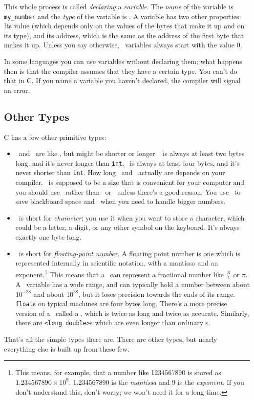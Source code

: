     This whole process is called {\em declaring}\/ a {\em variable}\/.
The {\em name}\/ of the variable is {\tt my\_number} and the {\em type}\/
of the variable is \int.  A variable has two other properties:  Its
value (which depends only on the values of the bytes that make it up and
on its type), and its address, which is the same as the address of the
first byte that makes it up.  Unless you say otherwise, \int\
variables always start with the value 0.

    In some languages you can use variables without declaring them; what
happens then is that the compiler assumes that they have a certain type.
You can't do that in C.  If you name a variable you haven't declared,
the compiler will signal an error.

\subsection{Other Types}

    C has a few other primitive types:

\begin{itemize}

\item \shortint\  and \longint\  are like \int, but might
be shorter or longer.  \shortint\ is always at least two bytes long, and
it's never longer than {\tt int}.  \longint\ is always at least four
bytes, and it's never shorter than {\tt int}.  How long \shortint\ and
\longint\ actually
are depends on your compiler.  \int\ is supposed to be a size that is
convenient for your computer and you should use \int\ rather than
\longint\ or \shortint\ unless there's a good
reason.  You use \shortint\ to save blackboard space and
\longint\ when you need to handle bigger numbers.

\item \chr\ is short for {\em character}\/; you use it when you
want to store a character, which could be a letter, a digit, or any
other symbol on the keyboard.  It's always exactly one byte long.

\item \float\ is short for {\em floating-point number}\/.  A
floating point number is one which is represented internally in
scientific notation, with a mantissa and an exponent.\footnote{This
means, for example, that a number like 1234567890 is stored as
$1.234567890\times 10^9$.  1.234567890 is the {\em mantissa}\/ and 9 is
the {\em exponent}\/.  If you don't understand this, don't worry; we
won't need it for a long time.} This means that a \float\ can represent
a fractional number like $3\over 4$ or $\pi$.  A \float\ variable has a
wide range, and can typically hold a number between about $10^{-38}$ and
about $10^{38}$, but it loses precision towards the ends of its range.
{\tt float}s on typical machines are four bytes long.  There's a more
precise version of a \float\ called a \double, which is twice as long
and twice as accurate.  Similarly, there are
\verb+<+{\tt long double}\verb+>+s which are even longer than ordinary
\double s.

\end{itemize}

That's all the simple types there are.  There are other types, but
nearly everything else is built up from these few.

